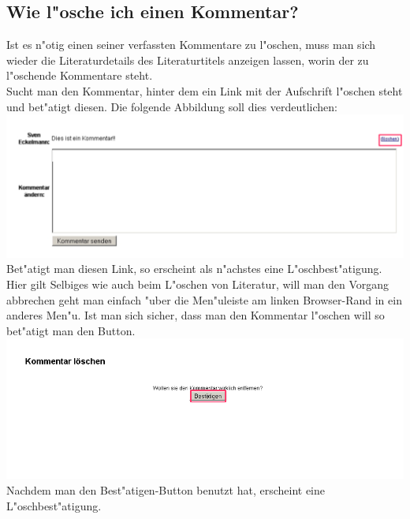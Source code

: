 \subsection{Wie l"osche ich einen Kommentar?}
Ist es n"otig einen seiner verfassten Kommentare zu l"oschen, muss man sich wieder die Literaturdetails des Literaturtitels anzeigen lassen, worin der zu l"oschende Kommentare steht.\\
Sucht man den Kommentar, hinter dem ein Link mit der Aufschrift l"oschen steht und bet"atigt diesen. Die folgende Abbildung soll dies verdeutlichen:\\
\includegraphics[scale=0.8]{comment4}\\
Bet"atigt man diesen Link, so erscheint als n"achstes eine L"oschbest"atigung. Hier gilt Selbiges wie auch beim L"oschen von Literatur, will man den Vorgang abbrechen geht man einfach "uber die Men"uleiste am linken Browser-Rand in ein anderes Men"u. Ist man sich sicher, dass man den Kommentar l"oschen will so bet"atigt man den Button.\\
\includegraphics[scale=0.8]{comment5}\\
Nachdem man den Best"atigen-Button benutzt hat, erscheint eine L"oschbest"atigung.

